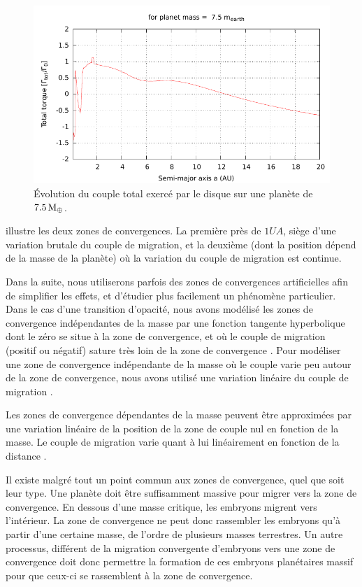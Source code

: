 \begin{figure}[htbp]
\centering
\includegraphics[width=0.75\linewidth]{figure/total_torque_fixed_m.pdf}
\caption{Évolution du couple total exercé par le disque sur une planète de $7.5\mathrm{\thinspace M_\oplus}$. }\label{fig:total_torque_fixed_m}
\end{figure}

 illustre les deux zones de convergences. La première près de $1\unit{UA}$, siège d'une
variation brutale du couple de migration, et la deuxième (dont la position dépend de la masse de la planète) où la variation du
couple de migration est continue. 

Dans la suite, nous utiliserons parfois des zones de convergences artificielles afin de simplifier les effets, et d'étudier
plus facilement un phénomène particulier. Dans le cas d'une transition d'opacité, nous avons modélisé les zones de convergence
indépendantes de la masse par une fonction tangente hyperbolique dont le zéro se situe à la zone de convergence, et où le couple de
migration (positif ou négatif) sature très loin de la zone de convergence . Pour modéliser une zone de
convergence indépendante de la masse où le couple varie peu autour de la zone de convergence, nous avons utilisé une variation
linéaire du couple de migration .

Les zones de convergence dépendantes de la masse peuvent être approximées par une variation linéaire de la position de la zone
de couple nul en fonction de la masse. Le couple de migration varie quant à lui linéairement en fonction de la distance
. 

\bigskip

Il existe malgré tout un point commun aux zones de convergence, quel que soit leur type. Une planète doit être suffisamment massive pour migrer vers la zone de convergence. En dessous d'une masse critique, les embryons migrent vers l'intérieur. La zone de convergence ne peut donc rassembler les embryons qu'à partir d'une certaine masse, de l'ordre de plusieurs masses terrestres. Un autre processus, différent de la migration convergente d'embryons vers une zone de convergence doit donc permettre la formation de ces embryons planétaires massif pour que ceux-ci se rassemblent à la zone de convergence.

